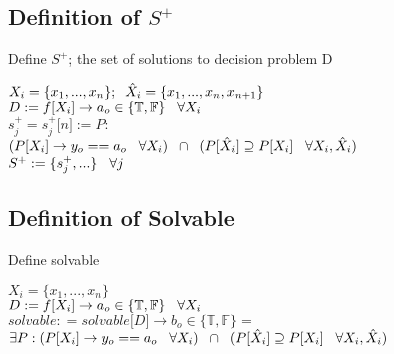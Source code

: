 \documentclass[11pt]{article}
\begin{document}
\subsection{Definition of $S^+$}
Define $S^+$; the set of solutions to decision problem D
\begin{center}
$
X_i = \{x_1,...,x_n\}; \hspace{2mm} \hat{X}_i = \{x_1,...,x_n,x_{n+1}\}
$
\\ \vspace{2mm}
$
D := f \lbrack X_i \rbrack \rightarrow a_{o} \in \{\mathbb{T}, \mathbb{F}\} \hspace{3mm} \forall X_i
$
\\ \vspace{2mm}
$
s_j^+ = s_j^+\lbrack n \rbrack := P :
$
\\ \vspace{2mm}
$
(P \lbrack X_i \rbrack \rightarrow y_{o} == a_{o} \hspace{3mm} \forall X_i) \hspace{2mm} \cap \hspace{2mm} (P[\hat{X}_i] \supseteq P[X_i] \hspace{3mm} \forall X_i,\hat{X}_i)
$
\\ \vspace{2mm}
$
S^+ := \{s^+_j,...\} \hspace{3mm} \forall j
$
\end{center}





\subsection{Definition of Solvable}
Define solvable
\begin{center}
$
X_i = \{x_1,...,x_n\}
$
\\ \vspace{2mm}
$
D := f \lbrack X_i \rbrack \rightarrow a_{o} \in \{\mathbb{T}, \mathbb{F}\} \hspace{3mm} \forall X_i
$
\\ \vspace{2mm}
$solvable : = solvable \lbrack D \rbrack \rightarrow b_o \in \{ \mathbb{T}, \mathbb{F} \} =$
\\ \vspace{2mm}
$\exists P : (P \lbrack X_i \rbrack \rightarrow y_{o} == a_{o} \hspace{3mm} \forall X_i) \hspace{2mm} \cap \hspace{2mm} (P[\hat{X}_i] \supseteq P[X_i] \hspace{3mm} \forall X_i,\hat{X}_i)
$
\end{center}
\end{document}
